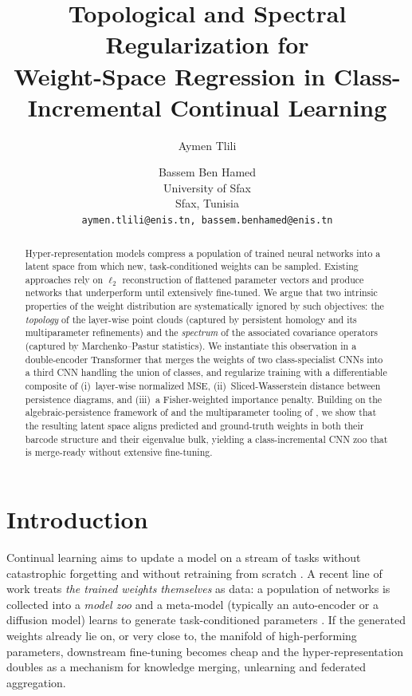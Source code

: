 \documentclass{article}
\title{Topological and Spectral Regularization for \\
       Weight-Space Regression in Class-Incremental Continual Learning}
\author{%
  Aymen Tlili \and Bassem Ben Hamed \\
  University of Sfax \\
  Sfax, Tunisia \\
  \texttt{aymen.tlili@enis.tn, bassem.benhamed@enis.tn}
}
\begin{document}
\maketitle

\begin{abstract}
Hyper-representation models compress a population of trained neural networks
into a latent space from which new, task-conditioned weights can be sampled.
Existing approaches rely on $\ell_2$ reconstruction of flattened parameter
vectors and produce networks that underperform until extensively
fine-tuned.  We argue that two intrinsic properties of the weight
distribution are systematically ignored by such objectives: the
\emph{topology} of the layer-wise point clouds (captured by persistent
homology and its multiparameter refinements) and the \emph{spectrum} of the
associated covariance operators (captured by Marchenko--Pastur statistics).
We instantiate this observation in a double-encoder Transformer that merges
the weights of two class-specialist CNNs into a third CNN handling the
union of classes, and regularize training with a differentiable composite
of (i)~layer-wise normalized MSE, (ii)~Sliced-Wasserstein distance between
persistence diagrams, and (iii)~a Fisher-weighted importance penalty.
Building on the algebraic-persistence framework of
\citet{oudotAlgebraicIntroductionPersistence2026} and the
multiparameter tooling of \citet{loiseauxStableVectorizationMultiparameter2024a,scoccolaDifferentiabilityOptimizationMultiparameter2024},
we show that the resulting latent space aligns predicted and ground-truth
weights in both their bar\-code structure and their eigenvalue bulk,
yielding a class-incremental CNN zoo that is merge-ready without extensive
fine-tuning.
\end{abstract}


\section{Introduction}
\label{sec:intro}

Continual learning aims to update a model on a stream of tasks without
catastrophic forgetting and without retraining from scratch
\citep{wangComprehensiveSurveyContinual2024,janv.2022ContinualLearningCourse}.
A recent line of work treats \emph{the trained weights themselves} as data:
a population of networks is collected into a \emph{model zoo} and a
meta-model (typically an auto-encoder or a diffusion model) learns to
generate task-conditioned parameters
\citep{schurholtHyperRepresentationsLearningPopulations2024,schurholtSelfSupervisedRepresentationLearning2021,schurholtHyperRepresentationsPreTrainingTransfer2022,soroDiffusionBasedNeuralNetwork2024,knyazevAcceleratingTrainingNeuron2025}.
If the generated weights already lie on, or very close to, the manifold
of high-performing parameters, downstream fine-tuning becomes cheap and
the hyper-representation doubles as a mechanism for knowledge merging,
unlearning and federated aggregation.
\end{document}

